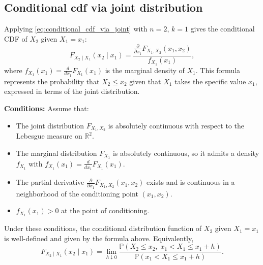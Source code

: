 \subsection{Conditional cdf via joint distribution}\label{subsec:bivariate_conditional_cdf}
Applying \eqref{eq:conditional_cdf_via_joint} with $n=2$, $k=1$ gives the conditional CDF of $X_2$ given $X_1=x_1$:
\begin{equation}\label{eq:bivariate_conditional_cdf}
F_{X_2\mid X_1}(x_2\mid x_1) = \frac{\displaystyle \frac{\partial}{\partial x_1} F_{X_1,X_2}(x_1,x_2)}{f_{X_1}(x_1)},
\end{equation}
where $f_{X_1}(x_1) = \frac{d}{dx_1} F_{X_1}(x_1)$ is the marginal density of $X_1$. This formula represents the probability that $X_2 \le x_2$ given that $X_1$ takes the specific value $x_1$, expressed in terms of the joint distribution.

\textbf{Conditions:} Assume that:
\begin{itemize}
\item The joint distribution $F_{X_1,X_2}$ is absolutely continuous with respect to the Lebesgue measure on $\mathbb{R}^2$.
\item The marginal distribution $F_{X_1}$ is absolutely continuous, so it admits a density $f_{X_1}$ with $f_{X_1}(x_1) = \frac{d}{dx_1}F_{X_1}(x_1)$.
\item The partial derivative $\frac{\partial}{\partial x_1}F_{X_1,X_2}(x_1,x_2)$ exists and is continuous in a neighborhood of the conditioning point $(x_1,x_2)$.
\item $f_{X_1}(x_1) > 0$ at the point of conditioning.
\end{itemize}

Under these conditions, the conditional distribution function of $X_2$ given $X_1=x_1$ is well-defined and given by the formula above. Equivalently,
\[
F_{X_2\mid X_1}(x_2\mid x_1)
=
\lim_{h\downarrow 0}
\frac{\mathbb{P}(X_2\le x_2,\;x_1<X_1\le x_1+h)}
{\mathbb{P}(x_1<X_1\le x_1+h)}.
\]
